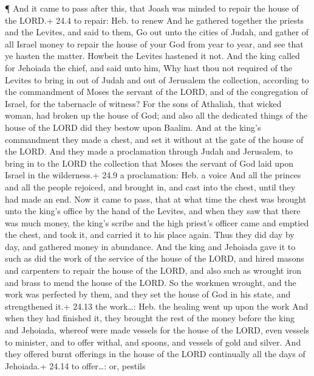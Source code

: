  ¶ And it came to pass after this, that Joash was minded to
repair the house of the LORD.+ 24.4 to repair: Heb. to renew
 And he gathered together the priests and the Levites, and
said to them, Go out unto the cities of Judah, and gather of all Israel
money to repair the house of your God from year to year, and see that ye
hasten the matter. Howbeit the Levites hastened it not.  And
the king called for Jehoiada the chief, and said unto him, Why hast thou
not required of the Levites to bring in out of Judah and out of
Jerusalem the collection, according to the commandment of Moses the
servant of the LORD, and of the congregation of Israel, for the
tabernacle of witness?  For the sons of Athaliah, that
wicked woman, had broken up the house of God; and also all the dedicated
things of the house of the LORD did they bestow upon Baalim.
 And at the king's commandment they made a chest, and set it
without at the gate of the house of the LORD.  And they made
a proclamation through Judah and Jerusalem, to bring in to the LORD the
collection that Moses the servant of God laid upon Israel in the
wilderness.+ 24.9 a proclamation: Heb. a voice  And all the
princes and all the people rejoiced, and brought in, and cast into the
chest, until they had made an end.  Now it came to pass,
that at what time the chest was brought unto the king's office by the
hand of the Levites, and when they saw that there was much money, the
king's scribe and the high priest's officer came and emptied the chest,
and took it, and carried it to his place again. Thus they did day by
day, and gathered money in abundance.  And the king and
Jehoiada gave it to such as did the work of the service of the house of
the LORD, and hired masons and carpenters to repair the house of the
LORD, and also such as wrought iron and brass to mend the house of the
LORD.  So the workmen wrought, and the work was perfected
by them, and they set the house of God in his state, and strengthened
it.+ 24.13 the work\ldots: Heb. the healing went up upon the work
 And when they had finished it, they brought the rest of
the money before the king and Jehoiada, whereof were made vessels for
the house of the LORD, even vessels to minister, and to offer withal,
and spoons, and vessels of gold and silver. And they offered burnt
offerings in the house of the LORD continually all the days of
Jehoiada.+ 24.14 to offer\ldots: or, pestils

